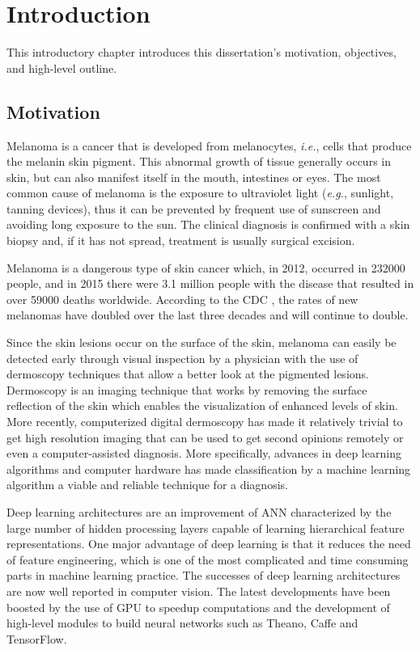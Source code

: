 \chapter{Introduction}
\label{chapter:introduction}

This introductory chapter introduces this dissertation's motivation, objectives, and high-level outline.

\section{Motivation}

Melanoma is a cancer that is developed from melanocytes, \textit{i.e.}, cells that produce the melanin skin pigment. This abnormal growth of tissue generally occurs in skin, but can also manifest itself in the mouth, intestines or eyes. The most common cause of melanoma is the exposure to ultraviolet light (\textit{e.g.}, sunlight, tanning devices), thus it can be prevented by frequent use of sunscreen and avoiding long exposure to the sun. The clinical diagnosis is confirmed with a skin biopsy and, if it has not spread, treatment is usually surgical excision.

Melanoma is a dangerous type of skin cancer which, in 2012, occurred in 232000 people, and in 2015 there were 3.1 million people with the disease that resulted in over 59000 deaths worldwide. According to the \ac{CDC} , the rates of new melanomas have doubled over the last three decades and will continue to double.

Since the skin lesions occur on the surface of the skin, melanoma can easily be detected early through visual inspection by a physician with the use of dermoscopy techniques that allow a better look at the pigmented lesions. Dermoscopy is an imaging technique that works by removing the surface reflection of the skin which enables the visualization of enhanced levels of skin. More recently, computerized digital dermoscopy has made it relatively trivial to get high resolution imaging that can be used to get second opinions remotely or even a computer-assisted diagnosis\cite{dermoscopy}. More specifically, advances in deep learning algorithms and computer hardware has made classification by a machine learning algorithm a viable and reliable technique for a diagnosis.

Deep learning architectures are an improvement of \ac{ANN} characterized by the large number of hidden processing layers capable of learning hierarchical feature representations. One major advantage of deep learning is that it reduces the need of feature engineering, which is one of the most complicated and time consuming parts in machine learning practice. The successes of deep learning architectures are now well reported in computer vision. The latest developments have been boosted by the use of \ac{GPU} to speedup computations and the development of high-level modules to build neural networks such as Theano, Caffe and TensorFlow.

